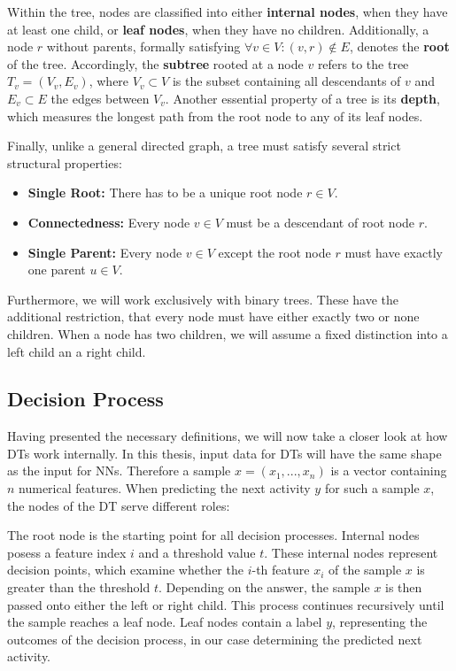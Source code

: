 Within the tree, nodes are classified into either \textbf{internal nodes},
when they have at least one child, or \textbf{leaf nodes},
when they have no children.
Additionally, a node $r$ without parents, formally satisfying $\forall v \in V: (v,r) \notin E$,
denotes the \textbf{root} of the tree.
Accordingly, the \textbf{subtree} rooted at a node $v$ refers to the tree $T_v = (V_v, E_v)$,
where $V_v \subset V$ is the subset containing all descendants of $v$ 
and $E_v \subset E$ the edges between $V_v$.
Another essential property of a tree is its \textbf{depth},
which measures the longest path from the root node to any of its leaf nodes.

Finally, unlike a general directed graph, a tree must satisfy several strict structural properties:
\begin{itemize}
  \item \textbf{Single Root:} There has to be a unique root node $r \in V$.
  \item \textbf{Connectedness:} Every node $v \in V$ must be a descendant of root node $r$.
  \item \textbf{Single Parent:} Every node $v \in V$ except the root node $r$ must have exactly one parent $u \in V$.
\end{itemize}
Furthermore, we will work exclusively with binary trees.
These have the additional restriction, that every node must have either exactly two or none children.
When a node has two children, we will assume a fixed distinction into a left child an a right child.

\subsection{Decision Process}
Having presented the necessary definitions,
we will now take a closer look at how DTs work internally.
In this thesis, input data for DTs will have the same shape as the input for NNs.
Therefore a sample $x = (x_1, ..., x_n)$ is a vector containing $n$ numerical features.
When predicting the next activity $y$ for such a sample $x$, the nodes of the DT serve different roles:

The root node is the starting point for all decision processes.
Internal nodes posess a feature index $i$ and a threshold value $t$.
These internal nodes represent decision points, which examine whether the $i$-th feature $x_i$ of the sample $x$
is greater than the threshold $t$.
Depending on the answer, the sample $x$ is then passed onto either the left or right child.
This process continues recursively until the sample reaches a leaf node.
Leaf nodes contain a label $y$, representing the outcomes of the decision process,
in our case determining the predicted next activity.

